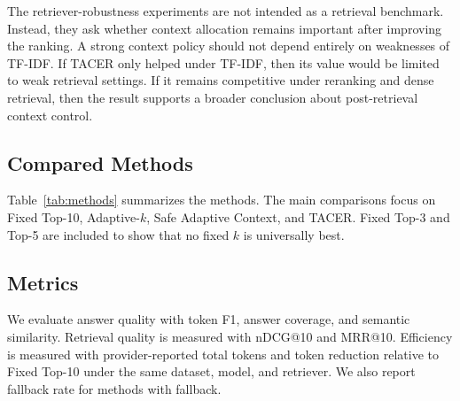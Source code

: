 \documentclass[11pt]{article}
\begin{document}
The retriever-robustness experiments are not intended as a retrieval benchmark. Instead, they ask whether context allocation remains important after improving the ranking. A strong context policy should not depend entirely on weaknesses of TF-IDF. If TACER only helped under TF-IDF, then its value would be limited to weak retrieval settings. If it remains competitive under reranking and dense retrieval, then the result supports a broader conclusion about post-retrieval context control.

\subsection{Compared Methods}

Table~\ref{tab:methods} summarizes the methods. The main comparisons focus on Fixed Top-10, Adaptive-$k$, Safe Adaptive Context, and TACER. Fixed Top-3 and Top-5 are included to show that no fixed $k$ is universally best.

\begin{table}[t]
\centering
\small
\caption{Compared context-selection methods.}
\label{tab:methods}
\end{table}

\subsection{Metrics}

We evaluate answer quality with token F1, answer coverage, and semantic similarity. Retrieval quality is measured with nDCG@10 and MRR@10. Efficiency is measured with provider-reported total tokens and token reduction relative to Fixed Top-10 under the same dataset, model, and retriever. We also report fallback rate for methods with fallback.
\end{document}
